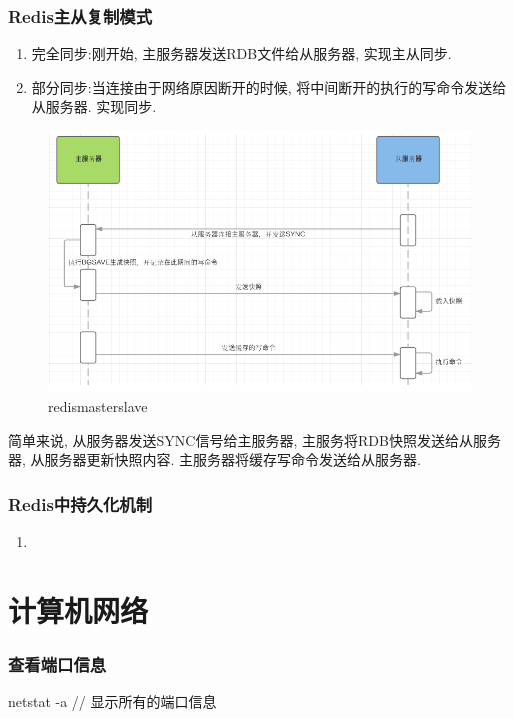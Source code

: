 \documentclass[UTF8]{ctexart}
\begin{document}
\subsubsection{Redis主从复制模式}
\begin{enumerate}
	\item 完全同步:刚开始, 主服务器发送RDB文件给从服务器, 实现主从同步.
	\item 部分同步:当连接由于网络原因断开的时候, 将中间断开的执行的写命令发送给从服务器. 实现同步.
\end{enumerate}

\begin{figure}
	\centering
	\includegraphics[width=0.7\linewidth]{figures/redismasterslave.png}
	\caption{redismasterslave}
	\label{fig:redismasterslave}
\end{figure}

简单来说, 从服务器发送SYNC信号给主服务器, 主服务将RDB快照发送给从服务器, 从服务器更新快照内容. 主服务器将缓存写命令发送给从服务器.

\subsubsection{Redis中持久化机制}
\begin{enumerate}
	\item
\end{enumerate}


\section{计算机网络}
\subsubsection{查看端口信息}
netstat -a // 显示所有的端口信息
\end{document}
